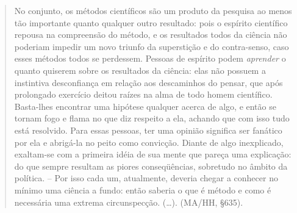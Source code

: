 \documentclass[
	12pt,				%
	openright,			%
	oneside,			%
	a4paper,			%
	english,			%
	french,				%
	spanish,			%
	brazil				%
	]{abntex2}
\begin{document}
\begin{quotation}
No conjunto, os métodos científicos são um produto da pesquisa ao menos tão importante quanto qualquer outro resultado: pois o espírito científico repousa na compreensão do método, e os resultados todos da ciência não poderiam impedir um novo triunfo da superstição e do contra-senso, caso esses métodos todos se perdessem. Pessoas de espírito podem \textit{aprender} o quanto quiserem sobre os resultados da ciência: elas não possuem a instintiva desconfiança em relação aos descaminhos do pensar, que após prolongado exercício deitou raízes na alma de todo homem científico. Basta-lhes encontrar uma hipótese qualquer acerca de algo, e então se tornam fogo e flama no que diz respeito a ela, achando que com isso tudo está resolvido. Para essas pessoas, ter uma opinião significa ser fanático por ela e abrigá-la no peito como convicção. Diante de algo inexplicado, exaltam-se com a primeira idéia de sua mente que pareça uma explicação: do que sempre resultam as piores conseqüências, sobretudo no âmbito da política. – Por isso cada um, atualmente, deveria chegar a conhecer no mínimo uma ciência a fundo: então saberia o que é método e como é necessária uma extrema circunspecção. (…).  (MA/HH, §635).
\end{quotation}
\end{document}
